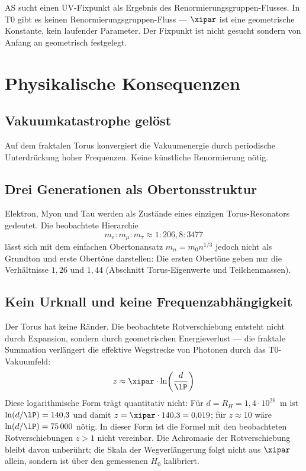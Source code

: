 AS sucht einen UV-Fixpunkt als Ergebnis des Renormierungsgruppen-Flusses. In T0 gibt es keinen Renormierungsgruppen-Fluss — $\xipar$ ist eine geometrische Konstante, kein laufender Parameter. Der Fixpunkt ist nicht gesucht sondern von Anfang an geometrisch festgelegt.

\section{Physikalische Konsequenzen}

\subsection{Vakuumkatastrophe gelöst}

Auf dem fraktalen Torus konvergiert die Vakuumenergie durch periodische Unterdrückung hoher Frequenzen. Keine künstliche Renormierung nötig.

\subsection{Drei Generationen als Obertonsstruktur}

Elektron, Myon und Tau werden als Zustände eines einzigen Torus-Resonators gedeutet. Die beobachtete Hierarchie
\begin{equation}
	m_e : m_\mu : m_\tau \approx 1 : 206{,}8 : 3477
\end{equation}
lässt sich mit dem einfachen Obertonansatz $m_n = m_0 n^{1/3}$ jedoch nicht als Grundton und erste Obertöne darstellen: Die ersten Obertöne geben nur die Verhältnisse $1{,}26$ und $1{,}44$ (Abschnitt Torus-Eigenwerte und Teilchenmassen).

\subsection{Kein Urknall und keine Frequenzabhängigkeit}

Der Torus hat keine Ränder. Die beobachtete Rotverschiebung entsteht nicht durch Expansion, sondern durch geometrischen Energieverlust — die fraktale Summation verlängert die effektive Wegstrecke von Photonen durch das T0-Vakuumfeld:
\begin{equation}
	z \approx \xipar \cdot \ln\!\left(\frac{d}{\lP}\right)
\end{equation}
Diese logarithmische Form trägt quantitativ nicht: Für $d = R_H = 1{,}4\cdot 10^{26}$~m ist $\ln(d/\lP) = 140{,}3$ und damit $z = \xipar \cdot 140{,}3 = 0{,}019$; für $z \approx 10$ wäre $\ln(d/\lP) = 75\,000$ nötig. In dieser Form ist die Formel mit den beobachteten Rotverschiebungen $z > 1$ nicht vereinbar. Die Achromasie der Rotverschiebung bleibt davon unberührt; die Skala der Wegverlängerung folgt nicht aus $\xipar$ allein, sondern ist über den gemessenen $H_0$ kalibriert.

